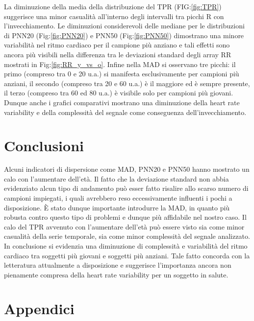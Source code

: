 \documentclass[12pt,a4paper, twoside, openright]{report}
\begin{document}
La diminuzione della media della distribuzione del TPR (FIG:\ref{fig:TPR}) suggerisce una minor casualità all'interno degli intervalli tra picchi R con l'invecchiamento.
Le diminuzioni considerevoli delle mediane per le distribuzioni di PNN20 (Fig:\ref{fig:PNN20}) e PNN50 (Fig:\ref{fig:PNN50}) dimostrano una minore variabilità nel ritmo cardiaco per il campione più anziano e tali effetti sono ancora più visibili nella differenza tra le deviazioni standard degli array RR mostrati in Fig:\ref{fig:RR_y_vs_o}.
Infine nella MAD si osservano tre picchi: il primo (compreso tra 0 e 20 u.a.) si manifesta esclusivamente per campioni più anziani, il secondo (compreso tra 20 e 60 u.a.) è il maggiore ed è sempre presente, il terzo (compreso tra 60 ed 80 u.a.) è visibile solo per campioni più giovani. 
Dunque anche i grafici comparativi mostrano una diminuzione della heart rate variability e della complessità del segnale come conseguenza dell'invecchiamento.



\chapter{Conclusioni}



Alcuni indicatori di dispersione come MAD, PNN20 e PNN50 hanno mostrato un calo con l'aumentare dell'età.
Il fatto che la deviazione standard non abbia evidenziato alcun tipo di andamento può esser fatto risalire allo scarso numero di campioni impiegati, i quali avrebbero reso eccessivamente influenti i pochi a disposizione.
È stato dunque importante introdurre la MAD, in quanto più robusta contro questo tipo di problemi e dunque più affidabile nel nostro caso.
Il calo del TPR avvenuto con l'aumentare dell'età può essere visto sia come minor casualità della serie temporale, sia come minor complessità del segnale analizzato. 
In conclusione si evidenzia una diminuzione di complessità e variabilità del ritmo cardiaco tra soggetti più giovani e soggetti più anziani.
Tale fatto concorda con la letteratura attualmente a disposizione e suggerisce l'importanza ancora non pienamente compresa della heart rate variability per un soggetto in salute.



\chapter*{Appendici}
\end{document}
